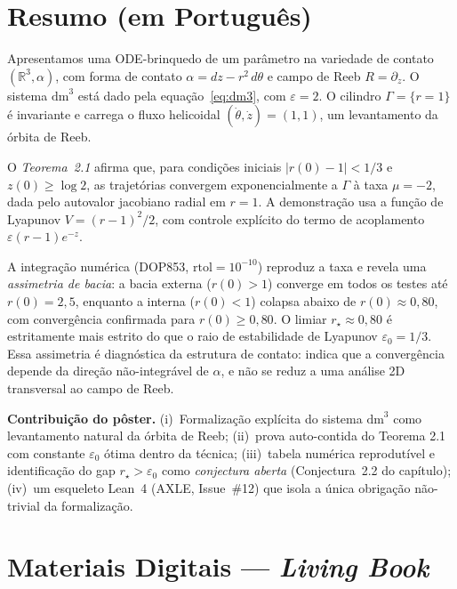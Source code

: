 \documentclass[11pt,a4paper]{article}
\begin{document}
\section*{Resumo (em Português)}

Apresentamos uma ODE-brinquedo de um parâmetro na variedade de contato $(\mathbb{R}^3,\alpha)$, com forma de contato $\alpha = dz - r^2\,d\theta$ e campo de Reeb $R = \partial_z$. O sistema $\mathrm{dm}^3$ está dado pela equação~\eqref{eq:dm3}, com $\varepsilon = 2$. O cilindro $\Gamma = \{r=1\}$ é invariante e carrega o fluxo helicoidal $(\dot\theta,\dot z) = (1,1)$, um levantamento da órbita de Reeb.

O \emph{Teorema~2.1} afirma que, para condições iniciais $|r(0)-1|<1/3$ e $z(0)\geq\log 2$, as trajetórias convergem exponencialmente a $\Gamma$ à taxa $\mu = -2$, dada pelo autovalor jacobiano radial em $r=1$. A demonstração usa a função de Lyapunov $V=(r-1)^2/2$, com controle explícito do termo de acoplamento $\varepsilon(r-1)e^{-z}$.

A integração numérica (DOP853, $\mathrm{rtol}=10^{-10}$) reproduz a taxa e revela uma \emph{assimetria de bacia}: a bacia externa ($r(0)>1$) converge em todos os testes até $r(0)=2{,}5$, enquanto a interna ($r(0)<1$) colapsa abaixo de $r(0)\approx 0{,}80$, com convergência confirmada para $r(0)\geq 0{,}80$. O limiar $r_\star\approx 0{,}80$ é estritamente mais estrito do que o raio de estabilidade de Lyapunov $\varepsilon_0 = 1/3$. Essa assimetria é diagnóstica da estrutura de contato: indica que a convergência depende da direção não-integrável de $\alpha$, e não se reduz a uma análise 2D transversal ao campo de Reeb.

\textbf{Contribuição do pôster.} (i)~Formalização explícita do sistema $\mathrm{dm}^3$ como levantamento natural da órbita de Reeb; (ii)~prova auto-contida do Teorema 2.1 com constante $\varepsilon_0$ ótima dentro da técnica; (iii)~tabela numérica reprodutível e identificação do gap $r_\star > \varepsilon_0$ como \emph{conjectura aberta} (Conjectura~2.2 do capítulo); (iv)~um esqueleto Lean~4 (AXLE, Issue~\#12) que isola a única obrigação não-trivial da formalização.

\section*{Materiais Digitais --- \emph{Living Book}}
\end{document}
